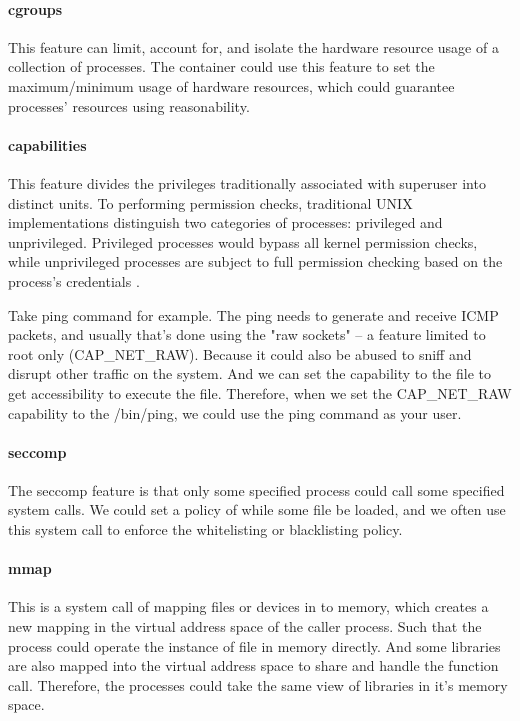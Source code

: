\documentclass[12pt,a4paper]{IEEEconf}
\begin{document}
\paragraph{cgroups}
This feature can limit, account for, and isolate the hardware resource usage of a
collection of processes\cite{cgroup_wiki}.
The container could use this feature to set the maximum/minimum usage of hardware
resources, which could guarantee processes' resources using reasonability.

\paragraph{capabilities}
This feature divides the privileges traditionally associated with superuser into
distinct units. To performing permission checks, traditional UNIX
implementations distinguish two categories of processes: privileged and unprivileged.
Privileged processes would bypass all kernel permission checks, while unprivileged
processes are subject to full permission checking based on the process's credentials
\cite{capabilities}.

Take ping command for example. The ping needs to generate and receive ICMP packets,
and usually that's done using the "raw sockets" – a feature limited to root only
(CAP\_NET\_RAW). Because it could also be abused to sniff and disrupt other traffic
on the system. And we can set the capability to the file to get accessibility to
execute the file.
Therefore, when we set the CAP\_NET\_RAW capability to the /bin/ping, we could use
the ping command as your user.

\paragraph{seccomp}
The seccomp feature is that only some specified process could call some specified
system calls. We could set a policy of while some file be loaded, and we often use
this system call to enforce the whitelisting or blacklisting policy.

\paragraph{mmap}
This is a system call of mapping files or devices in to memory, which creates a
new mapping in the virtual address space of the caller process. Such that
the process could operate the instance of file in memory directly.
And some libraries are also mapped into the virtual address space to share and handle
the function call. Therefore, the processes could take the same view of libraries in
it's memory space.
\end{document}
